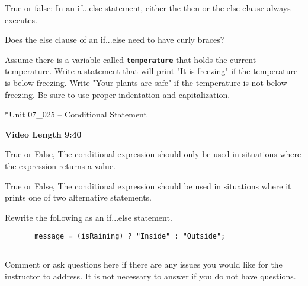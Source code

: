 \documentclass[letterpaper,12pt]{exam}
\newcommand{\unit}{Unit 07}
\begin{document}
\begin{questions}
\begin{samepage}
    \question True or false:  In an if...else statement, either the then or the else clause always executes.
    \vspace{5mm}
\end{samepage}

\begin{samepage}
    \question Does the else clause of an if...else need to have curly braces?
    \vspace{5mm}
\end{samepage}

\begin{samepage}
    \question Assume there is a variable called \texttt{\textbf{temperature}} that holds the current temperature.  Write a statement that will print "It is freezing" if the temperature is below freezing.  Write "Your plants are safe" if the temperature is not below freezing.  Be sure to use proper indentation and capitalization.
    \vspace{5mm}
\end{samepage}


*{\unit\_025 -- Conditional Statement} %
\par{\selectfont\textbf{Video Length 9:40}}

\begin{samepage}
    \question True or False, The conditional expression should only be used in situations where the expression returns a value.
    \vspace{5mm}
\end{samepage}

\begin{samepage}
    \question True or False, The conditional expression should be used in situations where it prints one of two alternative statements.
    \vspace{5mm}
\end{samepage}

\begin{samepage}
    \question Rewrite the following as an if...else statement.
    \begin{verbatim}
       message = (isRaining) ? "Inside" : "Outside";
    \end{verbatim}
    \vspace{35mm}
\end{samepage}


\begin{samepage}
    \begin{center}
    \rule{0.8\textwidth}{.4pt}
    \end{center}
	\question Comment or ask questions here if there are any issues you would like for the instructor to address.  It is not necessary to answer if you do not have questions.
	\vspace{30mm}
\end{samepage}

\end{questions}
\end{document}
